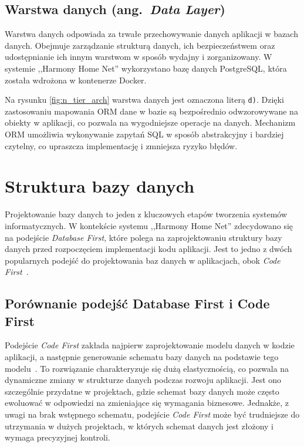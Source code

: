 \subsection{Warstwa danych (ang.\ \emph{Data Layer})}

Warstwa danych odpowiada za trwałe przechowywanie danych aplikacji w bazach danych. Obejmuje zarządzanie strukturą danych, ich bezpieczeństwem oraz udostępnianie ich innym warstwom w sposób wydajny i zorganizowany. W systemie ,,Harmony Home Net'' wykorzystano bazę danych PostgreSQL, która została wdrożona w kontenerze Docker. 

Na rysunku \ref{fig:n_tier_arch} warstwa danych jest oznaczona literą \texttt{d)}. Dzięki zastosowaniu mapowania ORM dane w bazie są bezpośrednio odwzorowywane na obiekty w aplikacji, co pozwala na wygodniejsze operacje na danych. Mechanizm ORM umożliwia wykonywanie zapytań SQL w sposób abstrakcyjny i bardziej czytelny, co upraszcza implementację i zmniejsza ryzyko błędów.


\section{Struktura bazy danych}

Projektowanie bazy danych to jeden z kluczowych etapów tworzenia systemów informatycznych. W kontekście systemu ,,Harmony Home Net'' zdecydowano się na podejście \emph{Database First}, które polega na zaprojektowaniu struktury bazy danych przed rozpoczęciem implementacji kodu aplikacji. Jest to jedno z dwóch popularnych podejść do projektowania baz danych w aplikacjach, obok \emph{Code First}~\cite{DB_FIRST_VS_CODE_FIRST_1,DB_FIRST_VS_CODE_FIRST_2}.

\subsection{Porównanie podejść Database First i Code First}

Podejście \emph{Code First} zakłada najpierw zaprojektowanie modelu danych w kodzie aplikacji, a następnie generowanie schematu bazy danych na podstawie tego modelu~\cite{CODE_FIRST}. To rozwiązanie charakteryzuje się dużą elastycznością, co pozwala na dynamiczne zmiany w strukturze danych podczas rozwoju aplikacji. Jest ono szczególnie przydatne w projektach, gdzie schemat bazy danych może często ewoluować w odpowiedzi na zmieniające się wymagania biznesowe. Jednakże, z uwagi na brak wstępnego schematu, podejście \emph{Code First} może być trudniejsze do utrzymania w dużych projektach, w których schemat danych jest złożony i wymaga precyzyjnej kontroli.

